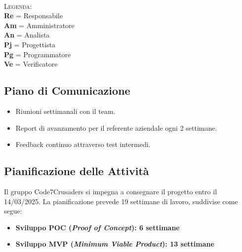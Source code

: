 \documentclass{article}
\begin{document}
        \\
        \textsc{Legenda:} \\
            \textbf{Re} = Responsabile \\
            \textbf{Am} = Amministratore \\
            \textbf{An} = Analista \\
            \textbf{Pj} = Progettista \\
            \textbf{Pg} = Programmatore \\
            \textbf{Ve} = Verificatore \\
        
            \subsection{Piano di Comunicazione}
            \begin{itemize}
                \item Riunioni settimanali con il team.
                \item Report di avanzamento per il referente aziendale ogni 2 settimane.
                \item Feedback continuo attraverso test intermedi.
            \end{itemize}
        
            \subsection{Pianificazione delle Attività}
                Il gruppo Code7Crusaders
                si impegna a consegnare il progetto entro il 14/03/2025. La pianificazione prevede
                19 settimane di lavoro, suddivise come segue:
                \begin{itemize}
                    \item \textbf{Sviluppo POC (\textit{Proof of Concept}): 6 settimane}
                    \item \textbf{Sviluppo MVP (\textit{Minimum Viable Product}): 13 settimane}
                \end{itemize}
        
\end{document}
